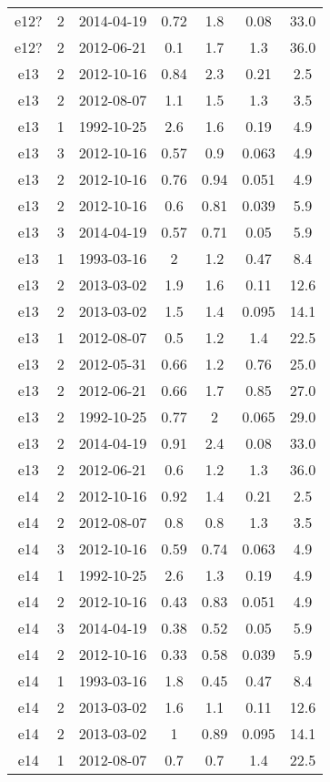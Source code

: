 \begin{table*}[htp]
\begin{tabular}{ccccccc}
e12? & 2 & 2014-04-19 & 0.72 & 1.8 & 0.08 & 33.0 \\
e12? & 2 & 2012-06-21 & 0.1 & 1.7 & 1.3 & 36.0 \\
e13 & 2 & 2012-10-16 & 0.84 & 2.3 & 0.21 & 2.5 \\
e13 & 2 & 2012-08-07 & 1.1 & 1.5 & 1.3 & 3.5 \\
e13 & 1 & 1992-10-25 & 2.6 & 1.6 & 0.19 & 4.9 \\
e13 & 3 & 2012-10-16 & 0.57 & 0.9 & 0.063 & 4.9 \\
e13 & 2 & 2012-10-16 & 0.76 & 0.94 & 0.051 & 4.9 \\
e13 & 2 & 2012-10-16 & 0.6 & 0.81 & 0.039 & 5.9 \\
e13 & 3 & 2014-04-19 & 0.57 & 0.71 & 0.05 & 5.9 \\
e13 & 1 & 1993-03-16 & 2 & 1.2 & 0.47 & 8.4 \\
e13 & 2 & 2013-03-02 & 1.9 & 1.6 & 0.11 & 12.6 \\
e13 & 2 & 2013-03-02 & 1.5 & 1.4 & 0.095 & 14.1 \\
e13 & 1 & 2012-08-07 & 0.5 & 1.2 & 1.4 & 22.5 \\
e13 & 2 & 2012-05-31 & 0.66 & 1.2 & 0.76 & 25.0 \\
e13 & 2 & 2012-06-21 & 0.66 & 1.7 & 0.85 & 27.0 \\
e13 & 2 & 1992-10-25 & 0.77 & 2 & 0.065 & 29.0 \\
e13 & 2 & 2014-04-19 & 0.91 & 2.4 & 0.08 & 33.0 \\
e13 & 2 & 2012-06-21 & 0.6 & 1.2 & 1.3 & 36.0 \\
e14 & 2 & 2012-10-16 & 0.92 & 1.4 & 0.21 & 2.5 \\
e14 & 2 & 2012-08-07 & 0.8 & 0.8 & 1.3 & 3.5 \\
e14 & 3 & 2012-10-16 & 0.59 & 0.74 & 0.063 & 4.9 \\
e14 & 1 & 1992-10-25 & 2.6 & 1.3 & 0.19 & 4.9 \\
e14 & 2 & 2012-10-16 & 0.43 & 0.83 & 0.051 & 4.9 \\
e14 & 3 & 2014-04-19 & 0.38 & 0.52 & 0.05 & 5.9 \\
e14 & 2 & 2012-10-16 & 0.33 & 0.58 & 0.039 & 5.9 \\
e14 & 1 & 1993-03-16 & 1.8 & 0.45 & 0.47 & 8.4 \\
e14 & 2 & 2013-03-02 & 1.6 & 1.1 & 0.11 & 12.6 \\
e14 & 2 & 2013-03-02 & 1 & 0.89 & 0.095 & 14.1 \\
e14 & 1 & 2012-08-07 & 0.7 & 0.7 & 1.4 & 22.5 \\

\end{tabular}
\end{table*}
